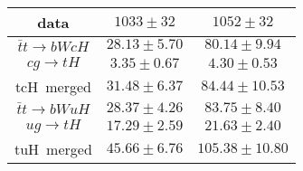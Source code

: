 \begin{table}[htbp]
\begin{tabular}{|c|c|c|}
data                  & $1033\pm32$                   & $1052\pm32$  \\\hline
$\bar{t}t\to bWcH$    & $28.13\pm5.70$        & $80.14\pm9.94$     \\
$cg\to tH$            & $3.35\pm0.67$                 & $4.30\pm0.53$      \\
tcH~merged            & $31.48\pm6.37$                & $84.44\pm10.53$     \\\hline
$\bar{t}t\to bWuH$    & $28.37\pm4.26$        & $83.75\pm8.40$     \\
$ug\to tH$            & $17.29\pm2.59$                & $21.63\pm2.40$     \\
tuH~merged            & $45.66\pm6.76$                & $105.38\pm10.80$    \\\hline
\end{tabular} 
%
%
%
\label{tab:Htautau_Prefit_Yields_Unblind}
\end{table} 

